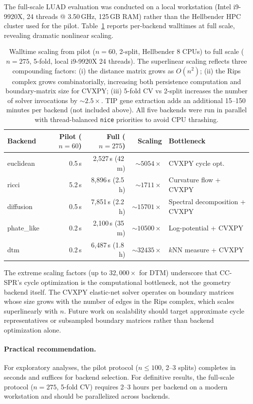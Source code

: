 \documentclass[11pt]{article}
\begin{document}
The full-scale LUAD evaluation was conducted on a local workstation (Intel i9-9920X, 24 threads @ 3.50\,GHz, 125\,GB RAM) rather than the Hellbender HPC cluster used for the pilot.
Table~\ref{tab:fullscale_timing} reports per-backend walltimes at full scale, revealing dramatic nonlinear scaling.

\begin{table}[h]
\centering\small
\begin{tabular}{lrrrl}
\toprule
Backend & Pilot ($n=60$) & Full ($n=275$) & Scaling & Bottleneck \\
\midrule
euclidean & 0.5\,s & 2,527\,s (42\,m) & ${\sim}5054\times$ & CVXPY cycle opt. \\
ricci & 5.2\,s & 8,896\,s (2.5\,h) & ${\sim}1711\times$ & Curvature flow + CVXPY \\
diffusion & 0.5\,s & 7,851\,s (2.2\,h) & ${\sim}15701\times$ & Spectral decomposition + CVXPY \\
phate\_like & 0.2\,s & 2,100\,s (35\,m) & ${\sim}10500\times$ & Log-potential + CVXPY \\
dtm & 0.2\,s & 6,487\,s (1.8\,h) & ${\sim}32435\times$ & $k$NN measure + CVXPY \\
\bottomrule
\end{tabular}
\caption{Walltime scaling from pilot ($n = 60$, 2-split, Hellbender 8 CPUs) to full scale ($n = 275$, 5-fold, local i9-9920X 24 threads).
The superlinear scaling reflects three compounding factors: (i) the distance matrix grows as $O(n^2)$; (ii) the Rips complex grows combinatorially, increasing both persistence computation and boundary-matrix size for CVXPY; (iii) 5-fold CV vs 2-split increases the number of solver invocations by ${\sim}2.5\times$.
TIP gene extraction adds an additional 15--150 minutes per backend (not included above).
All five backends were run in parallel with thread-balanced \texttt{nice} priorities to avoid CPU thrashing.}
\label{tab:fullscale_timing}
\end{table}

The extreme scaling factors (up to $32{,}000\times$ for DTM) underscore that CC-SPR's cycle optimization is the computational bottleneck, not the geometry backend itself.
The CVXPY elastic-net solver operates on boundary matrices whose size grows with the number of edges in the Rips complex, which scales superlinearly with $n$.
Future work on scalability should target approximate cycle representatives or subsampled boundary matrices rather than backend optimization alone.

\paragraph{Practical recommendation.}
For exploratory analyses, the pilot protocol ($n \leq 100$, 2--3 splits) completes in seconds and suffices for backend selection.
For definitive results, the full-scale protocol ($n = 275$, 5-fold CV) requires 2--3 hours per backend on a modern workstation and should be parallelized across backends.
\end{document}
